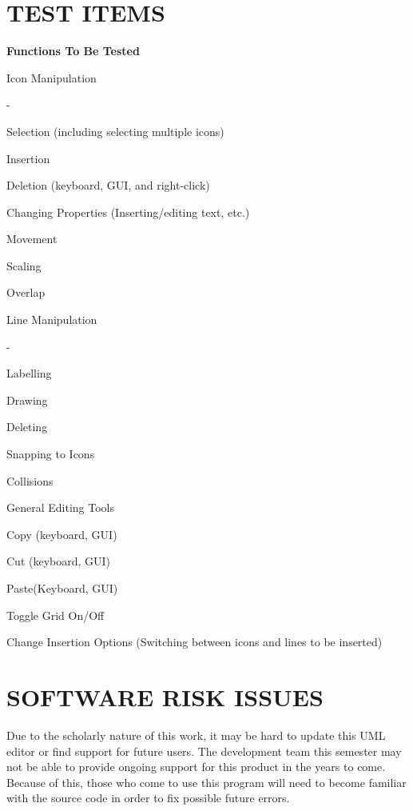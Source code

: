 \documentclass[twoside,letterpaper]{article}
\begin{document}
\section[TEST ITEMS]{\bfseries\color{black} TEST ITEMS}
{\color{black}
{\bfseries\color{black} Functions To Be Tested}
\begin{list}{-}{ }
\item Icon Manipulation
\begin{list} {-}{ }
\item Selection (including selecting multiple icons)
\item Insertion
\item Deletion (keyboard, GUI, and right-click)
\item Changing Properties (Inserting/editing text, etc.)
\item Movement
\item Scaling
\item Overlap
\end{list}
\item Line Manipulation
\begin{list} {-}{ }
\item Labelling
\item Drawing
\item Deleting
\item Snapping to Icons
\item Collisions
\end{list}
\item General Editing Tools
\begin{list}{-}{ }
\item Copy (keyboard, GUI)
\item Cut (keyboard, GUI)
\item Paste(Keyboard, GUI)
\item Toggle Grid On/Off
\item Change Insertion Options (Switching between icons and lines to be inserted)
\end{list}
\end{list}

}

\section[SOFTWARE RISK ISSUES]{\bfseries\color{black} SOFTWARE RISK ISSUES}
{\color{black}
Due to the scholarly nature of this work, it may be hard to update this UML editor or find support for future users. The development team this semester may not be able to provide ongoing support for this product in the years to come. Because of this, those who come to use this program will need to become familiar with the source code in order to fix possible future errors.
}
\end{document}
